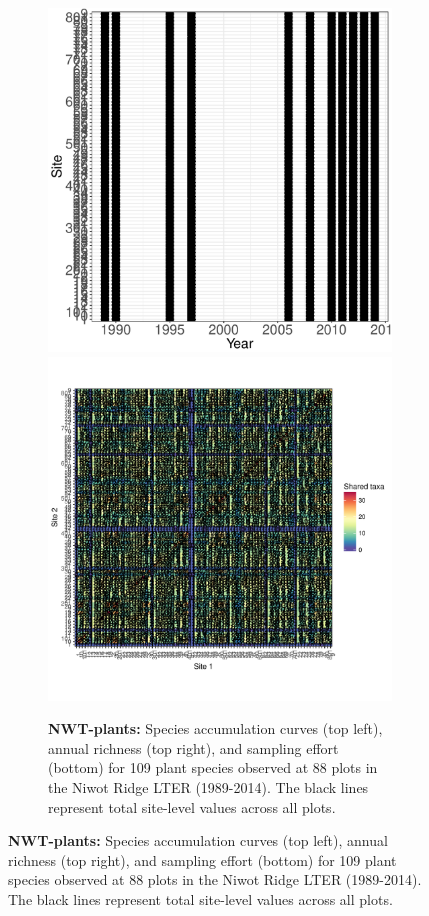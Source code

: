 \documentclass[11pt, oneside]{article}
\begin{document}
\begin{figure}[h!]
\begin{figure}[h!]
\includegraphics[scale = 0.4]{nwt-plants-hallett_spatiotemporal_sampling_effort.pdf}
\includegraphics[scale = 0.4]{nwt-plants-hallett_spp_shared.pdf}
\caption{{\bf NWT-plants:} Species accumulation curves (top left),  annual richness (top right), and sampling effort (bottom)  for 109 plant species observed at 88 plots in the Niwot Ridge LTER (1989-2014). The black lines represent total site-level values across all plots.}
\label{nwt-plants}
\end{figure}



\end{figure}
\end{document}
